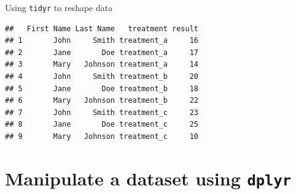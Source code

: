\documentclass[14pt,ignorenonframetext,]{bredelebeamer}
\newenvironment{Shaded}{\begin{snugshade}}{\end{snugshade}}
\newcommand{\KeywordTok}[1]{\textcolor[rgb]{0.94,0.87,0.69}{#1}}
\newcommand{\DataTypeTok}[1]{\textcolor[rgb]{0.87,0.87,0.75}{#1}}
\newcommand{\DecValTok}[1]{\textcolor[rgb]{0.86,0.86,0.80}{#1}}
\newcommand{\StringTok}[1]{\textcolor[rgb]{0.80,0.58,0.58}{#1}}
\newcommand{\OperatorTok}[1]{\textcolor[rgb]{0.94,0.94,0.82}{#1}}
\newcommand{\NormalTok}[1]{\textcolor[rgb]{0.80,0.80,0.80}{#1}}
\begin{document}
\begin{frame}[fragile]{Using \texttt{tidyr} to reshape data}

\begin{Shaded}
\end{Shaded}

\begin{verbatim}
##   First Name Last Name   treatment result
## 1       John     Smith treatment_a     16
## 2       Jane       Doe treatment_a     17
## 3       Mary   Johnson treatment_a     14
## 4       John     Smith treatment_b     20
## 5       Jane       Doe treatment_b     18
## 6       Mary   Johnson treatment_b     22
## 7       John     Smith treatment_c     23
## 8       Jane       Doe treatment_c     25
## 9       Mary   Johnson treatment_c     10
\end{verbatim}

\end{frame}

\section{\texorpdfstring{Manipulate a dataset using
\texttt{dplyr}}{Manipulate a dataset using dplyr}}\label{manipulate-a-dataset-using-dplyr}
\end{document}
